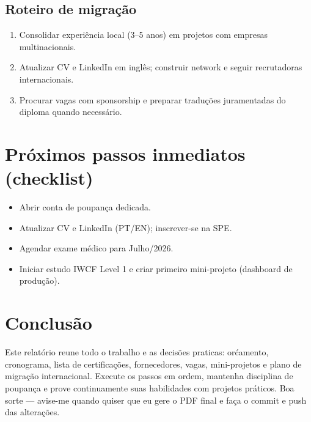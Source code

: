 \documentclass[11pt,openany]{book}
\begin{document}
\subsection{Roteiro de migra\c{c}\~ao}
\begin{enumerate}
  \item Consolidar experi\^encia local (3--5 anos) em projetos com empresas multinacionais.
  \item Atualizar CV e LinkedIn em ingl\^es; construir network e seguir recrutadoras internacionais.
  \item Procurar vagas com sponsorship e preparar tradu\c{c}\~oes juramentadas do diploma quando necess\'ario.
\end{enumerate}

\section{Pr\'oximos passos inmediatos (checklist)}
\begin{itemize}
  \item Abrir conta de poupan\c{c}a dedicada.
  \item Atualizar CV e LinkedIn (PT/EN); inscrever-se na SPE.
  \item Agendar exame m\'edico para Julho/2026.
  \item Iniciar estudo IWCF Level 1 e criar primeiro mini-projeto (dashboard de produ\c{c}\~ao).
\end{itemize}

\section*{Conclus\~ao}
Este relat\'orio reune todo o trabalho e as decis\~oes praticas: or\'camento, cronograma, lista de certifica\c{c}\~oes, fornecedores, vagas, mini-projetos e plano de migra\c{c}\~ao internacional. Execute os passos em ordem, mantenha disciplina de poupan\c{c}a e prove continuamente suas habilidades com projetos pr\'aticos. Boa sorte — avise-me quando quiser que eu gere o PDF final e fa\c{c}a o commit e push das altera\c{c}\~oes.

\end{document}
